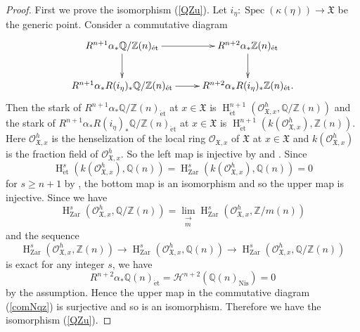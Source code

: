 \documentclass{article}
\newcommand{\spec}{\operatorname{Spec}}
\newcommand{\et}{\mathrm{\acute{e}t}}
\newcommand{\Nis}{\mathrm{Nis}}
\newcommand{\Zar}{\mathrm{Zar}}
\newcommand{\HO}{\operatorname{H}}
\begin{document}
%
\begin{proof}
First we prove the isomorphism (\ref{QZu}). 
Let $i_{\eta}: \spec(\kappa(\eta))\to \mathfrak{X}$ be the generic point.  
Consider a commutative diagram
%
\begin{equation}\label{comNqz}
\xymatrix{
R^{n+1}\alpha_{*}
\mathbb{Q}/\mathbb{Z}(n)_{\et}
\ar[r]\ar[d]
&
R^{n+2}\alpha_{*}
\mathbb{Z}(n)_{\et}
\ar[d]
\\
R^{n+1}\alpha_{*}
R(i_{\eta})_{*}
\mathbb{Q}/\mathbb{Z}(n)_{\et}
\ar[r]
&
R^{n+2}\alpha_{*}
R(i_{\eta})_{*}
\mathbb{Z}(n)_{\et}.
}
\end{equation}
%
Then the stark of 
%
\begin{math}
R^{n+1}\alpha_{*}\mathbb{Q}/\mathbb{Z}(n)_{\et}    
\end{math}
%
at $x\in \mathfrak{X}$ is
%
\begin{math}
\HO^{n+1}_{\et}(\mathcal{O}_{\mathfrak{X}, x}^{h}, \mathbb{Q}/\mathbb{Z}(n))
\end{math}
%
and the stark of
%
\begin{math}
R^{n+1}\alpha_{*}
R(i_{\eta})_{*}\mathbb{Q}/\mathbb{Z}(n)_{\et}
\end{math}
%
at $x\in \mathfrak{X}$ is
%
\begin{math}
\HO^{n+1}_{\et}(
k(\mathcal{O}^{h}_{\mathfrak{X}, x}),
\mathbb{Z}(n)
).    
\end{math}
%
Here $\mathcal{O}_{\mathfrak{X}, x}^{h}$ is the henselization of
the local ring 
$\mathcal{O}_{\mathfrak{X}, x}$ 
of $\mathfrak{X}$ at $x\in \mathfrak{X}$
and $k(\mathcal{O}^{h}_{\mathfrak{X}, x})$ is the fraction field
of $\mathcal{O}_{\mathfrak{X}, x}^{h}$.
So the left map is injective by \cite[Proposition 4.2]{Sak4} and \cite[p.35, Proposition 5]{SM19}.
Since
%
\begin{equation*}
\HO^{s}_{\et}(
k(\mathcal{O}^{h}_{\mathfrak{X}, x}),
\mathbb{Q}(n)
)    
=
\HO^{s}_{\Zar}(
k(\mathcal{O}^{h}_{\mathfrak{X}, x}),
\mathbb{Q}(n)
) 
=0
\end{equation*}
%
for $s\geq n+1$
by \cite[p.781, Proposition 3.6]{Ge},
the bottom map is an isomorphism and so the upper map is injective.
Since we have
%
\begin{equation*}
\HO^{s}_{\Zar}(
\mathcal{O}^{h}_{\mathfrak{X}, x},
\mathbb{Q}/\mathbb{Z}(n)
)    
=
\lim_{\substack{
\to \\ m}}
\HO^{s}_{\Zar}(
\mathcal{O}^{h}_{\mathfrak{X}, x},
\mathbb{Z}/m(n)
)    
\end{equation*}
%
and the sequence
%
\begin{equation*}
\HO^{s}_{\Zar}(
\mathcal{O}^{h}_{\mathfrak{X}, x},
\mathbb{Z}(n)
)
\to
\HO^{s}_{\Zar}(
\mathcal{O}^{h}_{\mathfrak{X}, x},
\mathbb{Q}(n)
)
\to
\HO^{s}_{\Zar}(
\mathcal{O}^{h}_{\mathfrak{X}, x},
\mathbb{Q}/\mathbb{Z}(n)
)
\end{equation*}
%
is exact for any integer $s$, we have 
%
\begin{equation*}
R^{n+2}\alpha_{*}\mathbb{Q}(n)_{\et}
=
\mathcal{H}^{n+2}(
\mathbb{Q}(n)_{\Nis}
)
=0
\end{equation*}
%
by the assumption. Hence the upper map in the commutative diagram (\ref{comNqz})
is surjective and so is an isomorphism.
Therefore we have the isomorphism (\ref{QZu}).


\end{proof}
\end{document}
